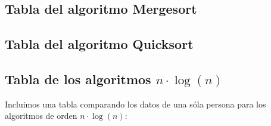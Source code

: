 \documentclass[a4paper, 11pt]{article}
\begin{document}
\subsection{Tabla del algoritmo Mergesort}

\subsection{Tabla del algoritmo Quicksort}


\subsection{Tabla de los algoritmos $n\cdot \log(n)$}

Incluimos una tabla comparando los datos de una sóla persona para los algoritmos
de orden $n\cdot \log(n)$:
\end{document}
